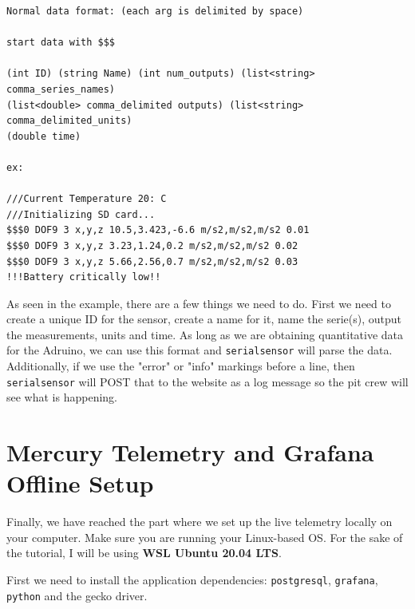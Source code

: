 \documentclass[12pt, letterpaper]{article}
\begin{document}
{{\begin{verbatim}
Normal data format: (each arg is delimited by space)

start data with $$$

(int ID) (string Name) (int num_outputs) (list<string> comma_series_names) 
(list<double> comma_delimited outputs) (list<string> comma_delimited_units) 
(double time)

ex:

///Current Temperature 20: C
///Initializing SD card...
$$$0 DOF9 3 x,y,z 10.5,3.423,-6.6 m/s2,m/s2,m/s2 0.01
$$$0 DOF9 3 x,y,z 3.23,1.24,0.2 m/s2,m/s2,m/s2 0.02
$$$0 DOF9 3 x,y,z 5.66,2.56,0.7 m/s2,m/s2,m/s2 0.03
!!!Battery critically low!!

\end{verbatim}

\par As seen in the example, there are a few things we need to do. First we need to create a unique ID for the sensor, create a name for it, name the serie(s), output the measurements, units and time. As long as we are obtaining quantitative data for the Adruino, we can use this format and \texttt{serialsensor} will parse the data. Additionally, if we use the "error" or "info" markings before a line, then \texttt{serialsensor} will POST that to the website as a log message so the pit crew will see what is happening. 
\section {Mercury Telemetry and Grafana Offline Setup}
\par Finally, we have reached the part where we set up the live telemetry locally on your computer. Make sure you are running your Linux-based OS. For the sake of the tutorial, I will be using \textbf{WSL Ubuntu 20.04 LTS}. 
\par
	First we need to install the application dependencies: \texttt{postgresql}, \texttt{grafana}, \texttt{python} and the gecko driver. \\[1\baselineskip]
	
}}
\end{document}
